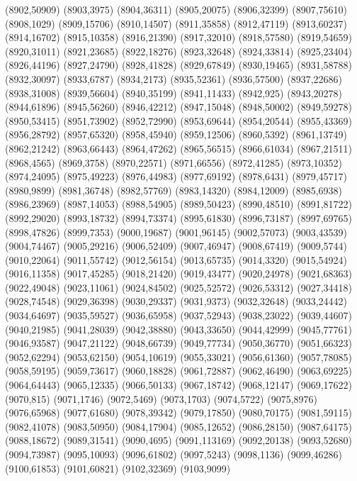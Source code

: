 (8902,50909)
(8903,3975)
(8904,36311)
(8905,20075)
(8906,32399)
(8907,75610)
(8908,1029)
(8909,15706)
(8910,14507)
(8911,35858)
(8912,47119)
(8913,60237)
(8914,16702)
(8915,10358)
(8916,21390)
(8917,32010)
(8918,57580)
(8919,54659)
(8920,31011)
(8921,23685)
(8922,18276)
(8923,32648)
(8924,33814)
(8925,23404)
(8926,44196)
(8927,24790)
(8928,41828)
(8929,67849)
(8930,19465)
(8931,58788)
(8932,30097)
(8933,6787)
(8934,2173)
(8935,52361)
(8936,57500)
(8937,22686)
(8938,31008)
(8939,56604)
(8940,35199)
(8941,11433)
(8942,925)
(8943,20278)
(8944,61896)
(8945,56260)
(8946,42212)
(8947,15048)
(8948,50002)
(8949,59278)
(8950,53415)
(8951,73902)
(8952,72990)
(8953,69644)
(8954,20544)
(8955,43369)
(8956,28792)
(8957,65320)
(8958,45940)
(8959,12506)
(8960,5392)
(8961,13749)
(8962,21242)
(8963,66443)
(8964,47262)
(8965,56515)
(8966,61034)
(8967,21511)
(8968,4565)
(8969,3758)
(8970,22571)
(8971,66556)
(8972,41285)
(8973,10352)
(8974,24095)
(8975,49223)
(8976,44983)
(8977,69192)
(8978,6431)
(8979,45717)
(8980,9899)
(8981,36748)
(8982,57769)
(8983,14320)
(8984,12009)
(8985,6938)
(8986,23969)
(8987,14053)
(8988,54905)
(8989,50423)
(8990,48510)
(8991,81722)
(8992,29020)
(8993,18732)
(8994,73374)
(8995,61830)
(8996,73187)
(8997,69765)
(8998,47826)
(8999,7353)
(9000,19687)
(9001,96145)
(9002,57073)
(9003,43539)
(9004,74467)
(9005,29216)
(9006,52409)
(9007,46947)
(9008,67419)
(9009,5744)
(9010,22064)
(9011,55742)
(9012,56154)
(9013,65735)
(9014,3320)
(9015,54924)
(9016,11358)
(9017,45285)
(9018,21420)
(9019,43477)
(9020,24978)
(9021,68363)
(9022,49048)
(9023,11061)
(9024,84502)
(9025,52572)
(9026,53312)
(9027,34418)
(9028,74548)
(9029,36398)
(9030,29337)
(9031,9373)
(9032,32648)
(9033,24442)
(9034,64697)
(9035,59527)
(9036,65958)
(9037,52943)
(9038,23022)
(9039,44607)
(9040,21985)
(9041,28039)
(9042,38880)
(9043,33650)
(9044,42999)
(9045,77761)
(9046,93587)
(9047,21122)
(9048,66739)
(9049,77734)
(9050,36770)
(9051,66323)
(9052,62294)
(9053,62150)
(9054,10619)
(9055,33021)
(9056,61360)
(9057,78085)
(9058,59195)
(9059,73617)
(9060,18828)
(9061,72887)
(9062,46490)
(9063,69225)
(9064,64443)
(9065,12335)
(9066,50133)
(9067,18742)
(9068,12147)
(9069,17622)
(9070,815)
(9071,1746)
(9072,5469)
(9073,1703)
(9074,5722)
(9075,8976)
(9076,65968)
(9077,61680)
(9078,39342)
(9079,17850)
(9080,70175)
(9081,59115)
(9082,41078)
(9083,50950)
(9084,17904)
(9085,12652)
(9086,28150)
(9087,64175)
(9088,18672)
(9089,31541)
(9090,4695)
(9091,113169)
(9092,20138)
(9093,52680)
(9094,73987)
(9095,10093)
(9096,61802)
(9097,5243)
(9098,1136)
(9099,46286)
(9100,61853)
(9101,60821)
(9102,32369)
(9103,9099)
